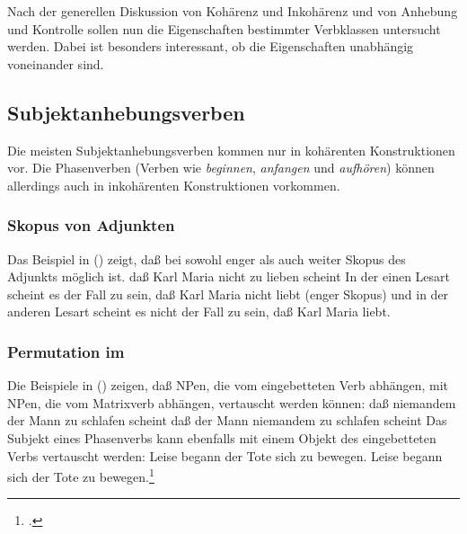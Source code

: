 Nach der generellen Diskussion von Kohärenz und Inkohärenz und von Anhebung und Kontrolle
sollen nun die Eigenschaften bestimmter Verbklassen untersucht werden. Dabei ist besonders
interessant, ob die Eigenschaften unabhängig voneinander sind.

\subsection{Subjektanhebungsverben}
\label{sec-subj-raising-verbs-phen}
\label{sec-phase-verbs-phen}

Die meisten Subjektanhebungsverben kommen nur in kohärenten Konstruktionen vor.
Die Phasenverben (Verben wie \emph{beginnen}, \emph{anfangen} und \emph{aufhören})
können allerdings auch in inkohärenten Konstruktionen vorkommen.

\subsubsection{Skopus von Adjunkten}
\label{sec-subj-rais-scope}

Das Beispiel in () zeigt, daß bei  sowohl enger als auch weiter
Skopus des Adjunkts möglich ist.
\eal
daß Karl Maria nicht zu lieben scheint
\zl
In der einen Lesart scheint es der Fall zu sein, daß Karl Maria nicht liebt (enger Skopus) und in der
anderen Lesart scheint es nicht der Fall zu sein, daß Karl Maria liebt.




\subsubsection{Permutation im \mf}
\label{sec-subj-rais-perm-mf}

Die Beispiele in () zeigen, daß NPen, die vom eingebetteten Verb abhängen,
mit NPen, die vom Matrixverb abhängen, vertauscht werden können:
\eal
\ex 
daß niemandem    der Mann zu schlafen scheint
\ex 
daß der Mann niemandem zu schlafen scheint
\zl
Das Subjekt eines Phasenverbs kann ebenfalls mit einem Objekt des
eingebetteten Verbs vertauscht werden:
\eal
\ex 
Leise   begann der Tote     sich zu bewegen.
\ex 
Leise   begann sich der Tote     zu bewegen.\footnote{
        .
    }
\zl


